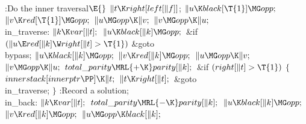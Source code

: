\Y\B\4:Do the inner traversal\X${}\E{}$\6
$\|t\K\\{right}[\\{left}[\|f]]{}$;\6
${}\|u\K\\{black}[\T{1}]\MG\\{opp};{}$\6
${}\|v\K\\{red}[\T{1}]\MG\\{opp};{}$\6
${}\|u\MG\\{opp}\K\|v;{}$\6
${}\|v\MG\\{opp}\K\|u;{}$\6
\4\\{in\_traverse}:\5
${}\|k\K\\{var}[\|t];{}$\6
${}\|u\K\\{black}[\|k]\MG\\{opp};{}$\6
\&{if} ${}(\|u\E\\{red}[\|k]\W\\{right}[\|t]>\T{1}){}$\1\5
\&{goto} \\{bypass};\2\6
${}\|u\K\\{black}[\|k]\MG\\{opp};{}$\6
${}\|v\K\\{red}[\|k]\MG\\{opp};{}$\6
${}\|u\MG\\{opp}\K\|v;{}$\6
${}\|v\MG\\{opp}\K\|u;{}$\6
${}\\{total\_parity}\MRL{+{\K}}\\{parity}[\|k];{}$\6
\&{if} ${}(\\{right}[\|t]>\T{1}){}$\5
${}\{{}$\1\6
${}\\{innerstack}[\\{innerptr}\PP]\K\|t;{}$\6
${}\|t\K\\{right}[\|t];{}$\6
\&{goto} \\{in\_traverse};\6
\4${}\}{}$\2\6
:Record a solution\X;\6
\4\\{in\_back}:\5
${}\|k\K\\{var}[\|t];{}$\6
${}\\{total\_parity}\MRL{-{\K}}\\{parity}[\|k];{}$\6
${}\|u\K\\{black}[\|k]\MG\\{opp};{}$\6
${}\|v\K\\{red}[\|k]\MG\\{opp};{}$\6
${}\|u\MG\\{opp}\K\\{black}[\|k];{}$\6
